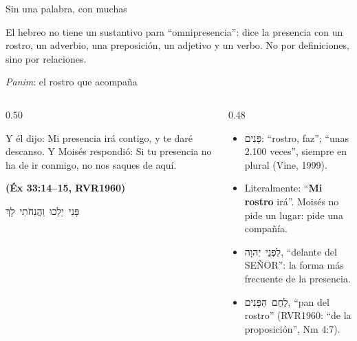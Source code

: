 \documentclass[hyperref={bookmarks=false},aspectratio=169]{beamer}
\newcommand{\heb}[1]{\mbox{\foreignlanguage{hebrew}{#1}}}
\newcommand{\SENOR}{S{\fontsize{0.78em}{1em}\selectfont EÑOR}}
\newcommand{\fuente}[1]{\par\hfill{\upshape\bfseries\footnotesize\textcolor{azul}{#1}}}
\newcommand{\destacar}[1]{\textbf{\textcolor{azul}{#1}}}
\begin{document}
\begin{frame}{Sin una palabra, con muchas}
\centering
{}\par\medskip
\small\RaggedRight El hebreo no tiene un sustantivo para ``omnipresencia'': dice la presencia con un rostro, un adverbio, una preposición, un adjetivo y un verbo. No por definiciones, sino por relaciones.
\end{frame}

\begin{frame}{\emph{Panim}: el rostro que acompaña}
\begin{columns}[c,onlytextwidth]
\begin{column}{0.50\textwidth}
\begin{cita}Y él dijo: Mi presencia irá contigo, y te daré descanso. Y Moisés respondió: Si tu presencia no ha de ir conmigo, no nos saques de aquí.\fuente{(Éx 33:14--15, RVR1960)}\end{cita}
\begin{center}\heb{פָּנַי יֵלֵכוּ וַהֲנִחֹתִי לָךְ}\end{center}
\end{column}
\begin{column}{0.48\textwidth}\small
\begin{itemize}
\item \heb{פָּנִים}: ``rostro, faz''; ``unas 2.100 veces'', siempre en plural (Vine, 1999).
\item Literalmente: ``\destacar{Mi rostro} irá''. Moisés no pide un lugar: pide una compañía.
\item \heb{לִפְנֵי יְהוָה}, ``delante del \SENOR'': la forma más frecuente de la presencia.
\item \heb{לֶחֶם הַפָּנִים}, ``pan del rostro'' (RVR1960: ``de la proposición'', Nm 4:7).
\end{itemize}
\end{column}
\end{columns}
\end{frame}
\end{document}
